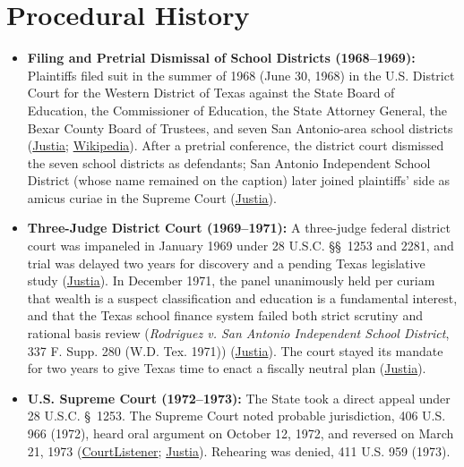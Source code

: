 \documentclass[12pt]{article}
\begin{document}
\section{Procedural History}

\begin{itemize}
\item \textbf{Filing and Pretrial Dismissal of School Districts (1968--1969):} Plaintiffs filed suit in the summer of 1968 (June 30, 1968) in the U.S. District Court for the Western District of Texas against the State Board of Education, the Commissioner of Education, the State Attorney General, the Bexar County Board of Trustees, and seven San Antonio-area school districts (\href{https://supreme.justia.com/cases/federal/us/411/1/}{Justia}; \href{https://en.wikipedia.org/wiki/San_Antonio_Independent_School_District_v._Rodriguez}{Wikipedia}). After a pretrial conference, the district court dismissed the seven school districts as defendants; San Antonio Independent School District (whose name remained on the caption) later joined plaintiffs' side as amicus curiae in the Supreme Court (\href{https://supreme.justia.com/cases/federal/us/411/1/}{Justia}).
\item \textbf{Three-Judge District Court (1969--1971):} A three-judge federal district court was impaneled in January 1969 under 28 U.S.C. \S\S~1253 and 2281, and trial was delayed two years for discovery and a pending Texas legislative study (\href{https://supreme.justia.com/cases/federal/us/411/1/}{Justia}). In December 1971, the panel unanimously held per curiam that wealth is a suspect classification and education is a fundamental interest, and that the Texas school finance system failed both strict scrutiny and rational basis review (\textit{Rodriguez v. San Antonio Independent School District}, 337 F. Supp. 280 (W.D. Tex. 1971)) (\href{https://supreme.justia.com/cases/federal/us/411/1/}{Justia}). The court stayed its mandate for two years to give Texas time to enact a fiscally neutral plan (\href{https://supreme.justia.com/cases/federal/us/411/1/}{Justia}).
\item \textbf{U.S. Supreme Court (1972--1973):} The State took a direct appeal under 28 U.S.C. \S~1253. The Supreme Court noted probable jurisdiction, 406 U.S. 966 (1972), heard oral argument on October 12, 1972, and reversed on March 21, 1973 (\href{https://www.courtlistener.com/opinion/108751/san-antonio-independent-school-district-v-rodriguez/}{CourtListener}; \href{https://supreme.justia.com/cases/federal/us/411/1/}{Justia}). Rehearing was denied, 411 U.S. 959 (1973).
\end{itemize}
\end{document}
